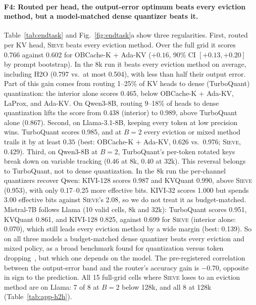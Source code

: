 \documentclass{article}
\newif\ifshowtbd \showtbdtrue
\newcommand{\tbd}[1]{\ifshowtbd{\color{tbdcol}\textbf{TBD}~#1}\else\ifhmode\unskip\fi\fi}
\newcommand{\sieve}{\textsc{Sieve}}
\theoremstyle{definition}
\begin{document}

\paragraph{F4: Routed per head, the output-error optimum beats every eviction method, but a model-matched dense quantizer beats it.}
Table~\ref{tab:endtask} and Fig.~\ref{fig:endtask}a show three regularities.  First, routed per KV head, \sieve{} beats every eviction method.  Over the full grid it scores 0.766 against 0.602 for OBCache-K + Ada-KV ($+0.16$, 90\% CI $[+0.13,+0.20]$ by prompt bootstrap).  In the 8k run it beats every eviction method on average, including H2O (0.797 vs.\ at most 0.504), with less than half their output error.  Part of this gain comes from routing 1--25\% of KV heads to dense (TurboQuant) quantization: the interior alone scores 0.465, below OBCache-K + Ada-KV, LaProx, and Ada-KV.  On Qwen3-8B, routing 9--18\% of heads to dense quantization lifts the score from 0.438 (interior) to 0.989, above TurboQuant alone (0.867).  Second, on Llama-3.1-8B, keeping every token at low precision wins.  TurboQuant scores 0.985, and at $B=2$ every eviction or mixed method trails it by at least $0.35$ (best: OBCache-K + Ada-KV, 0.626 vs.\ 0.976; \sieve{}, 0.429).  Third, on Qwen3-8B at $B=2$, TurboQuant's per-token rotated keys break down on variable tracking ($0.46$ at 8k, $0.40$ at 32k).  This reversal belongs to TurboQuant, not to dense quantization.  In the 8k run the per-channel quantizers recover Qwen: KIVI-128 scores 0.987 and KVQuant 0.990, above \sieve{} (0.953), with only 0.17--0.25 more effective bits.  KIVI-32 scores 1.000 but spends 3.00 effective bits against \sieve{}'s 2.08, so we do not treat it as budget-matched.  Mistral-7B follows Llama (10 valid cells, 8k and 32k): TurboQuant scores 0.951, KVQuant 0.861, and KIVI-128 0.825, against 0.699 for \sieve{} (interior alone: 0.070), which still leads every eviction method by a wide margin (best: 0.139).  So on all three models a budget-matched dense quantizer beats every eviction and mixed policy, as a broad benchmark found for quantization versus token dropping~\citep{yuan2024kvbench}, but which one depends on the model.  The pre-registered correlation between the output-error band and the router's accuracy gain is $-0.70$, opposite in sign to the prediction.  All 15 full-grid cells where \sieve{} loses to an eviction method are on Llama: 7 of 8 at $B=2$ below 128k, and all 8 at 128k (Table~\ref{tab:app-h2h}).
\end{document}
